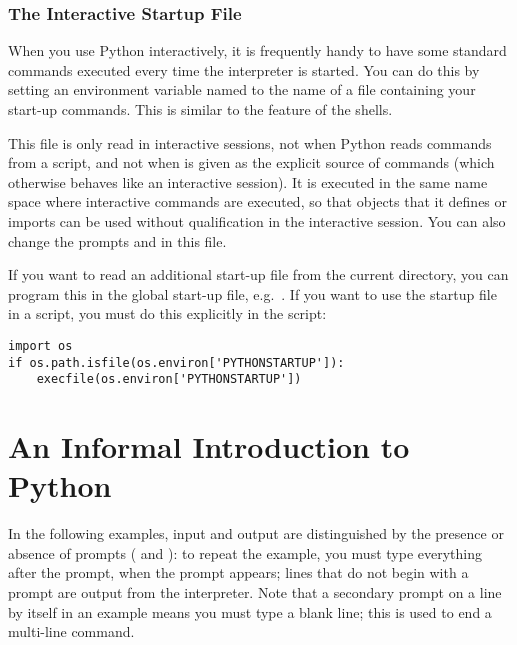 \documentclass{manual}
\begin{document}
\subsection{The Interactive Startup File}
\label{startup}


When you use Python interactively, it is frequently handy to have some
standard commands executed every time the interpreter is started.  You
can do this by setting an environment variable named
 to the name of a file containing your start-up
commands.  This is similar to the  feature of the \UNIX{}
shells.

This file is only read in interactive sessions, not when Python reads
commands from a script, and not when  is given as the
explicit source of commands (which otherwise behaves like an
interactive session).  It is executed in the same name space where
interactive commands are executed, so that objects that it defines or
imports can be used without qualification in the interactive session.
You can also change the prompts  and  in
this file.

If you want to read an additional start-up file from the current
directory, you can program this in the global start-up file,
e.g.\ .  If
you want to use the startup file in a script, you must do this
explicitly in the script:

\begin{verbatim}
import os
if os.path.isfile(os.environ['PYTHONSTARTUP']):
    execfile(os.environ['PYTHONSTARTUP'])
\end{verbatim}


\chapter{An Informal Introduction to Python}
\label{informal}

In the following examples, input and output are distinguished by the
presence or absence of prompts (\samp{>>> } and ): to repeat
the example, you must type everything after the prompt, when the
prompt appears; lines that do not begin with a prompt are output from
the interpreter.%
Note that a secondary prompt on a line by itself in an example means
you must type a blank line; this is used to end a multi-line command.
\end{document}
